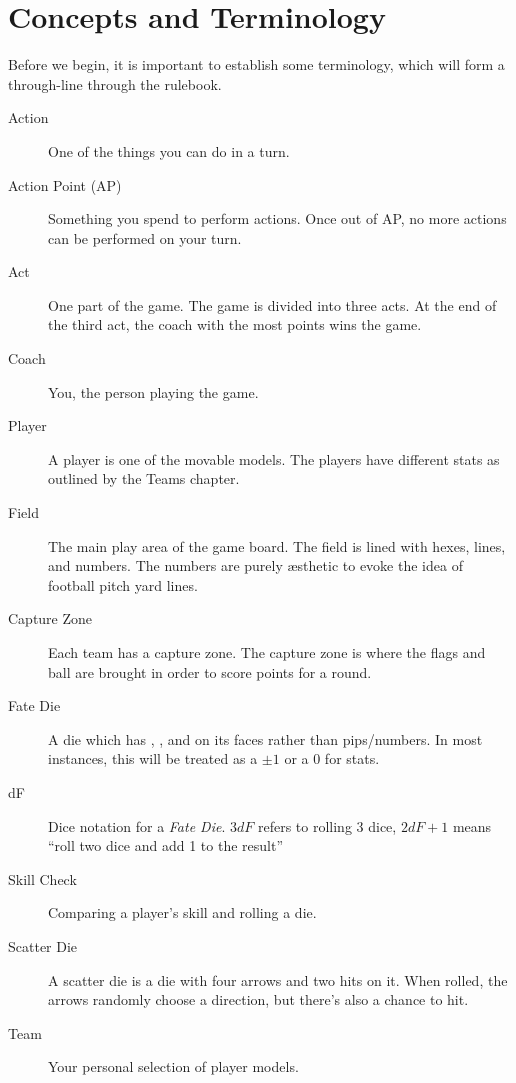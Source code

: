 \chapter{Concepts and Terminology}
Before we begin, it is important to establish some terminology, which will form a through-line through the rulebook.

\begin{description}
\item[Action] One of the things you can do in a turn.
\item[Action Point (AP)] Something you spend to perform actions. Once out of AP, no more actions can be performed on your turn.
\item[Act] One part of the game. The game is divided into three acts. At the end of the third act, the coach with the most points wins the game.
\item[Coach] You, the person playing the game.
\item[Player] A player is one of the movable models.
The players have different stats as outlined by the Teams chapter.
\item[Field] The main play area of the game board. The field is lined with hexes, lines, and numbers. The numbers are purely æsthetic to evoke the idea of football pitch yard lines.
\item[Capture Zone] Each team has a capture zone.
The capture zone is where the flags and ball are brought in order to score points for a round.
\item[Fate Die] A die which has \plus{}, \minus{}, and \blank{} on its faces rather than pips/numbers.
In most instances, this will be treated as a $\pm 1$ or a 0 for stats.
\item[dF] Dice notation for a \textit{Fate Die}. 
$3dF$ refers to rolling 3 \fate{} dice, $2dF+1$ means ``roll two \fate{} dice and add 1 to the result''
\item[Skill Check] Comparing a player's skill and rolling a \fate{} die.
\item[Scatter Die] A scatter die is a die with four arrows and two hits on it. When rolled, the arrows randomly choose a direction, but there's also a chance to hit.
\item[Team] Your personal selection of player models.
\end{description}